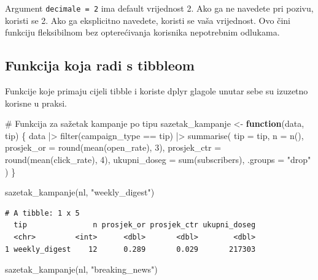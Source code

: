 \documentclass[
  croatian,
  letterpaper,
  DIV=11,
  numbers=noendperiod]{scrartcl}
\newenvironment{Shaded}{\begin{snugshade}}{\end{snugshade}}
\newcommand{\AttributeTok}[1]{\textcolor[rgb]{0.40,0.45,0.13}{#1}}
\newcommand{\CommentTok}[1]{\textcolor[rgb]{0.37,0.37,0.37}{#1}}
\newcommand{\ControlFlowTok}[1]{\textcolor[rgb]{0.00,0.23,0.31}{\textbf{#1}}}
\newcommand{\DecValTok}[1]{\textcolor[rgb]{0.68,0.00,0.00}{#1}}
\newcommand{\FunctionTok}[1]{\textcolor[rgb]{0.28,0.35,0.67}{#1}}
\newcommand{\NormalTok}[1]{\textcolor[rgb]{0.00,0.23,0.31}{#1}}
\newcommand{\OtherTok}[1]{\textcolor[rgb]{0.00,0.23,0.31}{#1}}
\newcommand{\SpecialCharTok}[1]{\textcolor[rgb]{0.37,0.37,0.37}{#1}}
\newcommand{\StringTok}[1]{\textcolor[rgb]{0.13,0.47,0.30}{#1}}
\begin{document}
Argument \texttt{decimale\ =\ 2} ima default vrijednost 2. Ako ga ne
navedete pri pozivu, koristi se 2. Ako ga eksplicitno navedete, koristi
se vaša vrijednost. Ovo čini funkciju fleksibilnom bez opterećivanja
korisnika nepotrebnim odlukama.

\subsection{Funkcija koja radi s
tibbleom}\label{funkcija-koja-radi-s-tibbleom}

Funkcije koje primaju cijeli tibble i koriste dplyr glagole unutar sebe
su izuzetno korisne u praksi.

\begin{Shaded}
\begin{Highlighting}[]
\CommentTok{\# Funkcija za sažetak kampanje po tipu}
\NormalTok{sazetak\_kampanje }\OtherTok{\textless{}{-}} \ControlFlowTok{function}\NormalTok{(data, tip) \{}
\NormalTok{  data }\SpecialCharTok{|\textgreater{}}
    \FunctionTok{filter}\NormalTok{(campaign\_type }\SpecialCharTok{==}\NormalTok{ tip) }\SpecialCharTok{|\textgreater{}}
    \FunctionTok{summarise}\NormalTok{(}
      \AttributeTok{tip =}\NormalTok{ tip,}
      \AttributeTok{n =} \FunctionTok{n}\NormalTok{(),}
      \AttributeTok{prosjek\_or =} \FunctionTok{round}\NormalTok{(}\FunctionTok{mean}\NormalTok{(open\_rate), }\DecValTok{3}\NormalTok{),}
      \AttributeTok{prosjek\_ctr =} \FunctionTok{round}\NormalTok{(}\FunctionTok{mean}\NormalTok{(click\_rate), }\DecValTok{4}\NormalTok{),}
      \AttributeTok{ukupni\_doseg =} \FunctionTok{sum}\NormalTok{(subscribers),}
      \AttributeTok{.groups =} \StringTok{"drop"}
\NormalTok{    )}
\NormalTok{\}}

\FunctionTok{sazetak\_kampanje}\NormalTok{(nl, }\StringTok{"weekly\_digest"}\NormalTok{)}
\end{Highlighting}
\end{Shaded}

\begin{verbatim}
# A tibble: 1 x 5
  tip               n prosjek_or prosjek_ctr ukupni_doseg
  <chr>         <int>      <dbl>       <dbl>        <dbl>
1 weekly_digest    12      0.289       0.029       217303
\end{verbatim}

\begin{Shaded}
\begin{Highlighting}[]
\FunctionTok{sazetak\_kampanje}\NormalTok{(nl, }\StringTok{"breaking\_news"}\NormalTok{)}
\end{Highlighting}
\end{Shaded}
\end{document}

